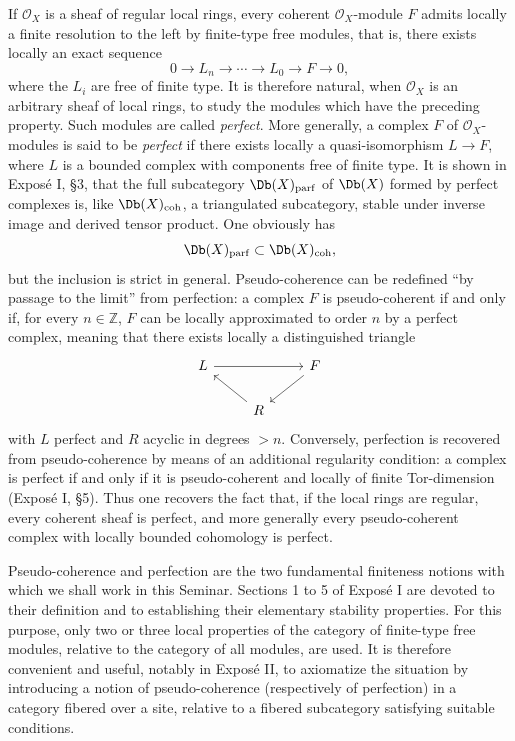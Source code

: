 \documentclass[11pt]{article}
\begin{document}
If \(\mathcal O_X\) is a sheaf of regular local rings, every coherent \(\mathcal O_X\)-module \(F\) admits locally a finite resolution to the left by finite-type free modules, that is, there exists locally an exact sequence
\[
  0\longrightarrow L_n\longrightarrow \cdots \longrightarrow L_0\longrightarrow F\longrightarrow 0,
\]
where the \(L_i\) are free of finite type. It is therefore natural, when \(\mathcal O_X\) is an arbitrary sheaf of local rings, to study the modules which have the preceding property. Such modules are called \emph{perfect}. More generally, a complex \(F\) of \(\mathcal O_X\)-modules is said to be \emph{perfect} if there exists locally a quasi-isomorphism \(L\to F\), where \(L\) is a bounded complex with components free of finite type. It is shown in Exposé I, §3, that the full subcategory \(\Db(X)_{\mathrm{parf}}\) of \(\Db(X)\) formed by perfect complexes is, like \(\Db(X)_{\mathrm{coh}}\), a triangulated subcategory, stable under inverse image and derived tensor product. One obviously has
\[
  \Db(X)_{\mathrm{parf}}\subset \Db(X)_{\mathrm{coh}},
\]
but the inclusion is strict in general. Pseudo-coherence can be redefined ``by passage to the limit'' from perfection: a complex \(F\) is pseudo-coherent if and only if, for every \(n\in\mathbb Z\), \(F\) can be locally approximated to order \(n\) by a perfect complex, meaning that there exists locally a distinguished triangle
\[
\begin{tikzcd}
L \arrow[rr] && F \arrow[dl]\\
& R \arrow[ul] &
\end{tikzcd}
\]
with \(L\) perfect and \(R\) acyclic in degrees \(>n\). Conversely, perfection is recovered from pseudo-coherence by means of an additional regularity condition: a complex is perfect if and only if it is pseudo-coherent and locally of finite Tor-dimension (Exposé I, §5). Thus one recovers the fact that, if the local rings are regular, every coherent sheaf is perfect, and more generally every pseudo-coherent complex with locally bounded cohomology is perfect.

Pseudo-coherence and perfection are the two fundamental finiteness notions with which we shall work in this Seminar. Sections 1 to 5 of Exposé I are devoted to their definition and to establishing their elementary stability properties. For this purpose, only two or three local properties of the category of finite-type free modules, relative to the category of all modules, are used. It is therefore convenient and useful, notably in Exposé II, to axiomatize the situation by introducing a notion of pseudo-coherence (respectively of perfection) in a category fibered over a site, relative to a fibered subcategory satisfying suitable conditions.
\end{document}

